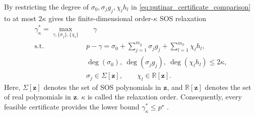 By restricting the degree of $\sigma_0, \sigma_j g_j, \chi_l h_l$ in
\eqref{eq:putinar_certificate_comparison} to at most \(2\kappa\) gives the
finite-dimensional order-\(\kappa\) SOS relaxation
\begin{subequations}\label{eq:sos_relaxation}
\begin{align}
 \gamma_{\kappa}^{*}=
 \max_{\gamma,\{\sigma_j\},\{\chi_l\}}
 &\quad \gamma
 \label{eq:sos_relaxation_objective}\\
 \text{s.t.}\quad
 &p-\gamma=\sigma_0+
 \sum_{j=1}^{m_g}\sigma_jg_j+
 \sum_{l=1}^{m_h}\chi_lh_l,
 \label{eq:sos_relaxation_identity}\\
 &\deg(\sigma_0),\ \deg(\sigma_jg_j),\ \deg(\chi_lh_l)
 \leq2\kappa,
 \label{eq:sos_relaxation_degree}\\
 &\sigma_j\in\Sigma[\bm{z}],
 \qquad
 \chi_l\in\mathbb{R}[\bm{z}].
 \label{eq:sos_relaxation_cones}
\end{align}
\end{subequations}
Here, \(\Sigma[\bm{z}]\) denotes the set of SOS polynomials in
\(\bm{z}\), and \(\mathbb{R}[\bm{z}]\) denotes the set of real
polynomials in \(\bm{z}\). $\kappa$ is called the relaxation order. 
Consequently, every feasible certificate provides the lower bound
\(\gamma_{\kappa}^{*}\leq p^\star\) \cite{Yang2024Semidefinite}.


